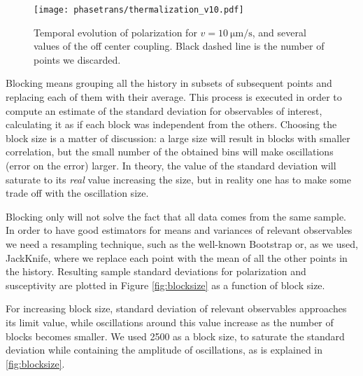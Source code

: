 \documentclass[../../master_thesis_np.tex]{subfiles}
\begin{document}
		\begin{figure}[hbtp]
			\centering
			\texttt{[image: phasetrans/thermalization\_v10.pdf]}
			\caption{Temporal evolution of polarization for $v = \SI{10}{\um\per\second}$, and several values of the off center coupling. Black dashed line is the number of points we discarded.}
			\label{fig:polar_therm}
		\end{figure}
		
		Blocking means grouping all the history in subsets of subsequent points and replacing each of them with their average.
		This process is executed in order to compute an estimate of the standard deviation for observables of interest, calculating it as if each block was independent from the others. 
		Choosing the block size is a matter of discussion: a large size will result in blocks with smaller correlation, but the small number of the obtained bins will make oscillations (error on the error) larger. 
		In theory, the value of the standard deviation will saturate to its \emph{real} value increasing the size, but in reality one has to make some trade off with the oscillation size.

		Blocking only will not solve the fact that all data comes from the same sample.
		In order to have good estimators for means and variances of relevant observables we need a resampling technique, such as the well-known Bootstrap or, as we used, JackKnife, where we replace each point with the mean of all the other points in the history.
		Resulting sample standard deviations for polarization and susceptivity are plotted in Figure \ref{fig:blocksize} as a function of block size.
		
		For increasing block size, standard deviation of relevant observables approaches its limit value, while oscillations around this value increase as the number of blocks becomes smaller.
		We used \num{2500} as a block size, to saturate the standard deviation while containing the amplitude of oscillations, as is explained in \ref{fig:blocksize}.
		
\end{document}
